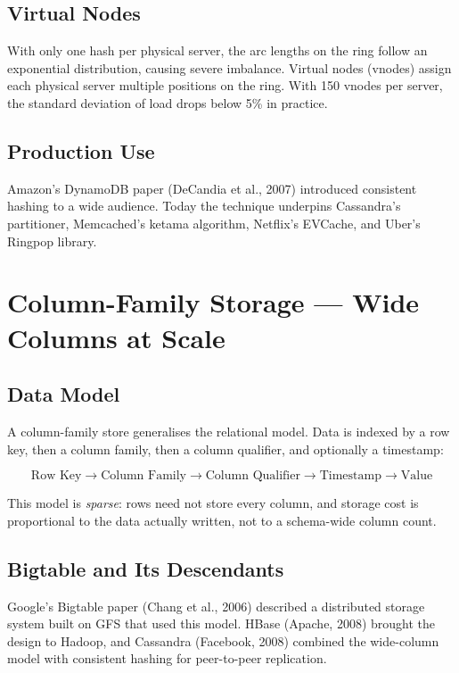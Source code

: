 \subsection{Virtual Nodes}

With only one hash per physical server, the arc lengths on the ring follow an
exponential distribution, causing severe imbalance.  Virtual nodes (vnodes) assign
each physical server multiple positions on the ring.  With 150 vnodes per server,
the standard deviation of load drops below 5\% in practice.

\subsection{Production Use}

Amazon's DynamoDB paper (DeCandia et al., 2007) introduced consistent hashing to
a wide audience.  Today the technique underpins Cassandra's partitioner, Memcached's
ketama algorithm, Netflix's EVCache, and Uber's Ringpop library.

\section{Column-Family Storage --- Wide Columns at Scale}

\subsection{Data Model}

A column-family store generalises the relational model.  Data is indexed by a row
key, then a column family, then a column qualifier, and optionally a timestamp:

\[
    \text{Row Key} \to \text{Column Family} \to \text{Column Qualifier}
    \to \text{Timestamp} \to \text{Value}
\]

This model is \emph{sparse}: rows need not store every column, and storage cost is
proportional to the data actually written, not to a schema-wide column count.

\subsection{Bigtable and Its Descendants}

Google's Bigtable paper (Chang et al., 2006) described a distributed storage system
built on GFS that used this model.  HBase (Apache, 2008) brought the design to
Hadoop, and Cassandra (Facebook, 2008) combined the wide-column model with
consistent hashing for peer-to-peer replication.

